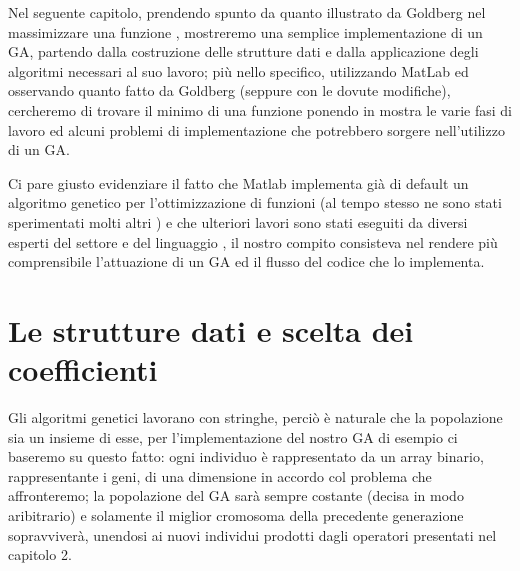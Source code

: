 
Nel seguente capitolo, prendendo spunto da quanto illustrato da Goldberg nel massimizzare una funzione \cite{goldberg1}, mostreremo una semplice implementazione di un GA, partendo dalla costruzione delle strutture dati e dalla applicazione degli algoritmi necessari al suo lavoro; pi\`u nello specifico, utilizzando MatLab ed osservando quanto fatto da Goldberg (seppure con le dovute modifiche), cercheremo di trovare il minimo di una funzione ponendo in mostra le varie fasi di lavoro ed alcuni problemi di implementazione che potrebbero sorgere nell'utilizzo di un GA.
\vspace{3mm}

Ci pare giusto evidenziare il fatto che Matlab implementa gi\`a di default un algoritmo genetico per l'ottimizzazione di funzioni (al tempo stesso ne sono stati sperimentati molti altri \cite{matlab3}) e che ulteriori lavori sono stati eseguiti da diversi esperti del settore e del linguaggio \cite{matlab1} \cite{matlab2}, il nostro compito consisteva nel rendere pi\`u comprensibile l'attuazione di un GA ed il flusso del codice che lo implementa.
\section{Le strutture dati e scelta dei coefficienti}
Gli algoritmi genetici lavorano con stringhe, perci\`o \`e naturale che la popolazione sia un insieme di esse, per l'implementazione del nostro GA di esempio ci baseremo su questo fatto: ogni individuo \`e rappresentato da un array binario, rappresentante i geni, di una dimensione in accordo col problema che affronteremo; la popolazione del GA sar\`a sempre costante (decisa in modo aribitrario) e solamente il miglior cromosoma della precedente generazione sopravviver\`a, unendosi ai nuovi individui prodotti dagli operatori presentati nel capitolo 2.

